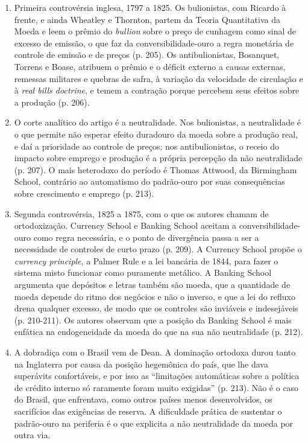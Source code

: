 \begin{enumerate}[leftmargin=*,nosep]
\item Primeira controvérsia inglesa, 1797 a 1825. Os bulionistas, com Ricardo
à frente, e ainda Wheatley e Thornton, partem da Teoria Quantitativa da Moeda
e leem o prêmio do \emph{bullion} sobre o preço de cunhagem como sinal de
excesso de emissão, o que faz da conversibilidade-ouro a regra monetária de
controle de emissão e de preços (p. 205). Os antibulionistas, Bosanquet,
Torrens e Boase, atribuem o prêmio e o déficit externo a causas externas,
remessas militares e quebras de safra, à variação da velocidade de circulação
e à \emph{real bills doctrine}, e temem a contração porque percebem seus
efeitos sobre a produção (p. 206).

\item O corte analítico do artigo é a neutralidade. Nos bulionistas, a
neutralidade é o que permite não esperar efeito duradouro da moeda sobre a
produção real, e daí a prioridade ao controle de preços; nos antibulionistas,
o receio do impacto sobre emprego e produção é a própria percepção da não
neutralidade (p. 207). O mais heterodoxo do período é Thomas Attwood, da
Birmingham School, contrário ao automatismo do padrão-ouro por suas
consequências sobre crescimento e emprego (p. 213).

\item Segunda controvérsia, 1825 a 1875, com o que os autores chamam de
ortodoxização. Currency School e Banking School aceitam a conversibilidade-ouro
como regra necessária, e o ponto de divergência passa a ser a necessidade de
controles de curto prazo (p. 209). A Currency School propõe o \emph{currency
principle}, a Palmer Rule e a lei bancária de 1844, para fazer o sistema misto
funcionar como puramente metálico. A Banking School argumenta que depósitos e
letras também são moeda, que a quantidade de moeda depende do ritmo dos
negócios e não o inverso, e que a lei do refluxo drena qualquer excesso, de
modo que os controles são inviáveis e indesejáveis (p. 210-211). Os autores
observam que a posição da Banking School é mais enfática na endogeneidade da
moeda do que na sua não neutralidade (p. 212).

\item A dobradiça com o Brasil vem de Dean. A dominação ortodoxa durou tanto
na Inglaterra por causa da posição hegemônica do país, que lhe dava superávits
confortáveis, e por isso as ``limitações automáticas sobre a política de
crédito interno só raramente foram muito exigidas'' (p. 213). Não é o caso do
Brasil, que enfrentava, como outros países menos desenvolvidos, os sacrifícios
das exigências de reserva. A dificuldade prática de sustentar o padrão-ouro na
periferia é o que explicita a não neutralidade da moeda por outra via.


\end{enumerate}
